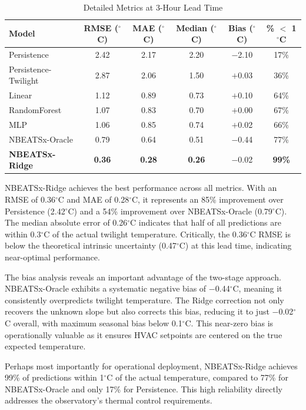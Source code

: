 \documentclass[11pt]{article}
\begin{document}
\begin{table}[H]
\centering
\caption{Detailed Metrics at 3-Hour Lead Time}
\label{tab:3h_metrics}
\begin{tabular}{lccccc}
\toprule
Model & RMSE ($^\circ$C) & MAE ($^\circ$C) & Median ($^\circ$C) & Bias ($^\circ$C) & \% $<$ 1$^\circ$C \\
\midrule
Persistence & 2.42 & 2.17 & 2.20 & $-$2.10 & 17\% \\
Persistence-Twilight & 2.87 & 2.06 & 1.50 & $+$0.03 & 36\% \\
Linear & 1.12 & 0.89 & 0.73 & $+$0.10 & 64\% \\
RandomForest & 1.07 & 0.83 & 0.70 & $+$0.00 & 67\% \\
MLP & 1.06 & 0.85 & 0.74 & $+$0.02 & 66\% \\
NBEATSx-Oracle & 0.79 & 0.64 & 0.51 & $-$0.44 & 77\% \\
\midrule
\textbf{NBEATSx-Ridge} & \textbf{0.36} & \textbf{0.28} & \textbf{0.26} & $-$0.02 & \textbf{99\%} \\
\bottomrule
\end{tabular}
\end{table}

NBEATSx-Ridge achieves the best performance across all metrics. With an RMSE of 0.36$^\circ$C and MAE of 0.28$^\circ$C, it represents an 85\% improvement over Persistence (2.42$^\circ$C) and a 54\% improvement over NBEATSx-Oracle (0.79$^\circ$C). The median absolute error of 0.26$^\circ$C indicates that half of all predictions are within 0.3$^\circ$C of the actual twilight temperature. Critically, the 0.36$^\circ$C RMSE is below the theoretical intrinsic uncertainty (0.47$^\circ$C) at this lead time, indicating near-optimal performance.

The bias analysis reveals an important advantage of the two-stage approach. NBEATSx-Oracle exhibits a systematic negative bias of $-$0.44$^\circ$C, meaning it consistently overpredicts twilight temperature. The Ridge correction not only recovers the unknown slope but also corrects this bias, reducing it to just $-$0.02$^\circ$C overall, with maximum seasonal bias below 0.1$^\circ$C. This near-zero bias is operationally valuable as it ensures HVAC setpoints are centered on the true expected temperature.

Perhaps most importantly for operational deployment, NBEATSx-Ridge achieves 99\% of predictions within 1$^\circ$C of the actual temperature, compared to 77\% for NBEATSx-Oracle and only 17\% for Persistence. This high reliability directly addresses the observatory's thermal control requirements.
\end{document}
